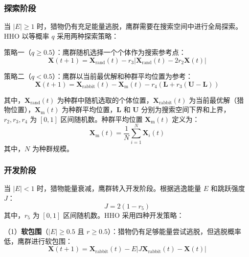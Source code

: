 \documentclass[12pt,a4paper]{article}
\begin{document}
\subsubsection{探索阶段}

当 $|E| \geq 1$ 时，猎物仍有充足能量逃脱，鹰群需要在搜索空间中进行全局探索。HHO 以等概率 $q$ 采用两种探索策略：

策略一（$q \geq 0.5$）：鹰群随机选择一个个体作为搜索参考点：
\begin{equation}
    \mathbf{X}(t+1) = \mathbf{X}_{\mathrm{rand}}(t) - r_3|\mathbf{X}_{\mathrm{rand}}(t) - 2r_2\mathbf{X}(t)|
    \label{eq:hho_explore_1}
\end{equation}

策略二（$q < 0.5$）：鹰群以当前最优解和种群平均位置为参考：
\begin{equation}
    \mathbf{X}(t+1) = \mathbf{X}_{\mathrm{rabbit}}(t) - \mathbf{X}_{\mathrm{m}}(t) - r_4\left(\mathbf{L} + r_3(\mathbf{U} - \mathbf{L})\right)
    \label{eq:hho_explore_2}
\end{equation}

其中，$\mathbf{X}_{\mathrm{rand}}(t)$ 为种群中随机选取的个体位置，$\mathbf{X}_{\mathrm{rabbit}}(t)$ 为当前最优解（猎物位置），$\mathbf{X}_{\mathrm{m}}(t)$ 为种群平均位置，$\mathbf{L}$ 和 $\mathbf{U}$ 分别为搜索空间下界和上界，$r_2, r_3, r_4$ 为 $[0,1]$ 区间随机数。种群平均位置 $\mathbf{X}_{\mathrm{m}}(t)$ 定义为：
\begin{equation}
    \mathbf{X}_{\mathrm{m}}(t) = \frac{1}{N}\sum_{i=1}^{N}\mathbf{X}_i(t)
    \label{eq:x_mean}
\end{equation}
其中，$N$ 为种群规模。

\subsubsection{开发阶段}

当 $|E| < 1$ 时，猎物能量衰减，鹰群转入开发阶段。根据逃逸能量 $E$ 和跳跃强度 $J$：
\begin{equation}
    J = 2(1 - r_5)
    \label{eq:jump_strength}
\end{equation}
其中，$r_5$ 为 $[0,1]$ 区间随机数。HHO 采用四种开发策略：

（1）\textbf{软包围}（$|E| \geq 0.5$ 且 $r \geq 0.5$）：猎物仍有足够能量尝试逃脱，但逃脱概率低，鹰群进行软包围：
\begin{equation}
    \mathbf{X}(t+1) = \mathbf{X}_{\mathrm{rabbit}}(t) - E|J\mathbf{X}_{\mathrm{rabbit}}(t) - \mathbf{X}(t)|
    \label{eq:soft_besiege}
\end{equation}
\end{document}
